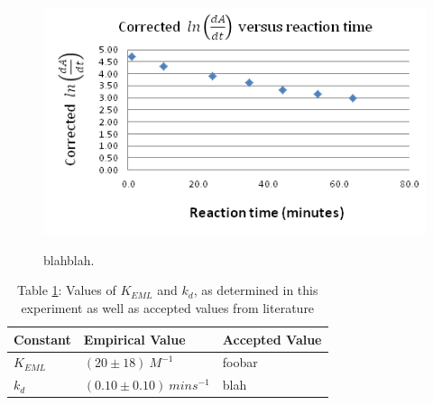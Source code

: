 \begin{figure}[h]
  \includegraphics[scale=0.5]{./Figures/016M_dipic_readings.png}\\
  \caption{blahblah.}\label{fig:0.016M_dipic_readings}
\end{figure}

\begin{center}
\begin{table}[h]
    \begin{tabular}{| l | l | l |}
    \hline
    Constant & Empirical Value & Accepted Value \\ \hline
    $K_{EML}$ & $(20\pm{18}){\ }M^{-1}$ & foobar \\ \hline
    $k_{d}$ & $(0.10\pm{0.10}){\ }mins^{-1}$ & blah \\ 
    \hline
    \end{tabular}
    \caption[Table caption text]{Table \ref{tbl:summary}: Values of $K_{EML}$ and $k_d$, as determined in this experiment as well as accepted values from literature}
    \label{tbl:summary}
\end{table}
\end{center}